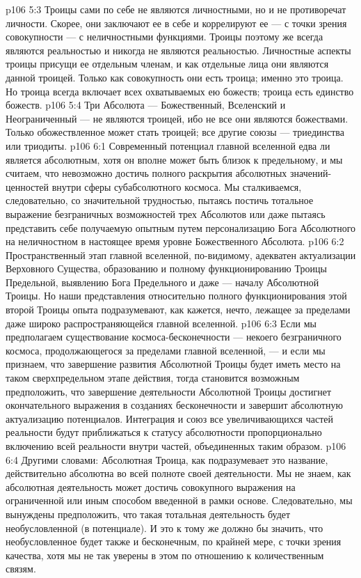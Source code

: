 \vs p106 5:3 Троицы сами по себе не являются личностными, но и не противоречат личности. Скорее, они заключают ее в себе и коррелируют ее --- с точки зрения совокупности --- с неличностными функциями. Троицы поэтому же всегда являются  реальностью и никогда не являются  реальностью. Личностные аспекты троицы присущи ее отдельным членам, и как отдельные лица они  являются данной троицей. Только как совокупность они есть троица; именно это  троица. Но троица всегда включает всех охватываемых ею божеств; троица есть единство божеств.
\vs p106 5:4 Три Абсолюта --- Божественный, Вселенский и Неограниченный --- не являются троицей, ибо не все они являются божествами. Только обожествленное может стать троицей; все другие союзы --- триединства или триодиты.
\vs p106 6:1 Современный потенциал главной вселенной едва ли является абсолютным, хотя он вполне может быть близок к предельному, и мы считаем, что невозможно достичь полного раскрытия абсолютных значений\hyp{}ценностей внутри сферы субабсолютного космоса. Мы сталкиваемся, следовательно, со значительной трудностью, пытаясь постичь тотальное выражение безграничных возможностей трех Абсолютов или даже пытаясь представить себе получаемую опытным путем персонализацию Бога Абсолютного на неличностном в настоящее время уровне Божественного Абсолюта.
\vs p106 6:2 Пространственный этап главной вселенной, по\hyp{}видимому, адекватен актуализации Верховного Существа, образованию и полному функционированию Троицы Предельной, выявлению Бога Предельного и даже --- началу Абсолютной Троицы. Но наши представления относительно полного функционирования этой второй Троицы опыта подразумевают, как кажется, нечто, лежащее за пределами даже широко распространяющейся главной вселенной.
\vs p106 6:3 Если мы предполагаем существование космоса\hyp{}бесконечности --- некоего безграничного космоса, продолжающегося за пределами главной вселенной, --- и если мы признаем, что завершение развития Абсолютной Троицы будет иметь место на таком сверхпредельном этапе действия, тогда становится возможным предположить, что завершение деятельности Абсолютной Троицы достигнет окончательного выражения в созданиях бесконечности и завершит абсолютную актуализацию  потенциалов. Интеграция и союз все увеличивающихся частей реальности будут приближаться к статусу абсолютности пропорционально включению всей реальности внутри частей, объединенных таким образом.
\vs p106 6:4 Другими словами: Абсолютная Троица, как подразумевает это название, действительно абсолютна во всей полноте своей деятельности. Мы не знаем, как абсолютная деятельность может достичь совокупного выражения на ограниченной или иным способом введенной в рамки основе. Следовательно, мы вынуждены предположить, что такая тотальная деятельность будет необусловленной (в потенциале). И это к тому же должно бы значить, что необусловленное будет также и бесконечным, по крайней мере, с точки зрения качества, хотя мы не так уверены в этом по отношению к количественным связям.
